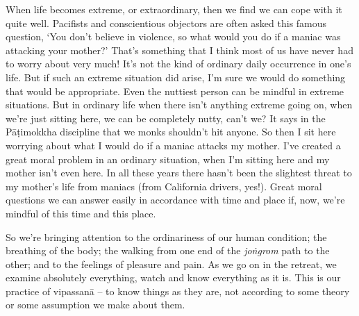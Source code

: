 When life becomes extreme, or extraordinary, then we find we can cope with it quite well. Pacifists and conscientious objectors are often asked this famous question, `You don't believe in violence, so what would you do if a maniac was attacking your mother?' That's something that I think most of us have never had to worry about very much! It's not the kind of ordinary daily occurrence in one's life. But if such an extreme situation did arise, I'm sure we would do something that would be appropriate. Even the nuttiest person can be mindful in extreme situations. But in ordinary life when there isn't anything extreme going on, when we're just sitting here, we can be completely nutty, can't we? It says in the P\=a\d{t}imokkha discipline that we monks shouldn't hit anyone. So then I sit here worrying about what I would do if a maniac attacks my mother. I've created a great moral problem in an ordinary situation, when I'm sitting here and my mother isn't even here. In all these years there hasn't been the slightest threat to my mother's life from maniacs (from California drivers, yes!). Great moral questions we can answer easily in accordance with time and place if, now, we're mindful of this time and this place.

So we're bringing attention to the ordinariness of our human condition; the breathing of the body; the walking from one end of the \textit{jo\.ngrom} path to the other; and to the feelings of pleasure and pain. As we go on in the retreat, we examine absolutely everything, watch and know everything as it is. This is our practice of vipassanā -- to know things as they are, not according to some theory or some assumption we make about them.

